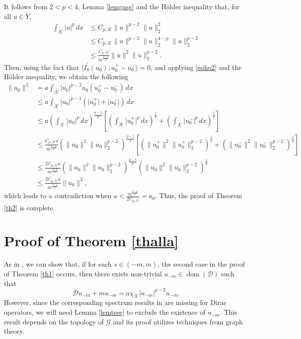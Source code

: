 \documentclass[11pt]{amsart}
\newcommand{\abs}[1]{\lvert#1\rvert}
\newcommand{\norm}[1]{\lVert#1\rVert}
\newcommand{\D}{\mathcal{D}}
\newcommand{\G}{\mathcal{G}}
\newcommand{\K}{\mathcal{K}}
\numberwithin{equation}{section}
\begin{document}
It follows from $2<p<4$, Lemma \ref{lemgnsg} and the H\"older inequality that, for all $u \in Y$,
\begin{equation}\label{eqho2}
\begin{aligned}
        \int_{\K}\abs{u}^p\, dx &\leq C_{p,\K}\norm{u}^{p-2}\norm{u}_2^2 \\
    &\leq C_{p,\K}\norm{u}^{p-2}\norm{u}_2^{4-p}\norm{u}_2^{p-2}\\
    &\leq \frac{C_{p,\K}}{m^\frac{4-p}{2}}\norm{u}^2\norm{u}_2^{p-2}.
\end{aligned}
\end{equation}
Then, using the fact that $\langle I_{0}^{\prime}(u_0), u^+_0 - u^-_0\rangle = 0$, and applying \eqref{eqho2} and the H\"older inequality, we obtain the following
\begin{equation}\label{eqi+-}
    \begin{aligned}
\norm{u_{0}}^{2} & = a\int_{\K}\abs{u_{0}}^{p-2} u_{0}(u_{0}^{+}-u_{0}^{-}) \,dx\\
& \leq a \int_{\K}\abs{u_{0}}^{p-1}(\abs{u_{0}^{+}}+\abs{u_{0}^{-}}) \,dx \\
& \leq a (\int_{\K}\abs{u_{0}}^p\,dx)^\frac{p-1}{p}\left[(\int_{\K}\abs{u_{0}^{+}}^p \,dx)^\frac{1}{p} + (\int_{\K}\abs{u_{0}^{-}}^p \,dx)^\frac{1}{p}\right]\\
& \leq \frac{C_{p,\K}a}{m^\frac{4-p}{2}}(\norm{u_0}^2\norm{u_0}_2^{p-2})^\frac{p-1}{p}\left[(\norm{u^+_0}^2\norm{u^+_0}_2^{p-2})^\frac{1}{p} + (\norm{u^-_0}^2\norm{u^-_0}_2^{p-2})^\frac{1}{p}\right]\\
& \leq \frac{2C_{p,\K}a}{m^\frac{4-p}{2}}(\norm{u_0}^2\norm{u_0}_2^{p-2})^\frac{p-1}{p}(\norm{u_0}^2\norm{u_0}_2^{p-2})^\frac{1}{p}\\
& \leq \frac{2C_{p,\K}a}{m^\frac{4-p}{2}}\norm{u_0}^2,
\end{aligned}
\end{equation}
which leads to a contradiction  when $a < \frac{m^\frac{4-p}{2}}{2C_{p,\K}} = a_0$. Thus, the proof of Theorem \ref{th2} is complete.

\section{Proof of Theorem \ref{thalla}}\label{sectalla}
As in \cite{Bu}, we can show that, if for each $s \in (-m,m)$, the second case in the proof of Theorem \ref{th1} occurs, then there exists non-trivial $u_{-m}\in \operatorname{dom}(\D)$ such that
\[
\D u_{-m}+mu_{-m}=a\chi_{\K}\abs{u_{-m}}^{p-2} u_{-m}.
\]
However, since the corresponding spectrum results in \cite{Bu} are missing for Dirac operators, we will need Lemma \ref{lemtree} to exclude the existence of $u_{-m}$. This result depends on the topology of $\G$ and its proof utilizes techniques from graph theory.
\end{document}
